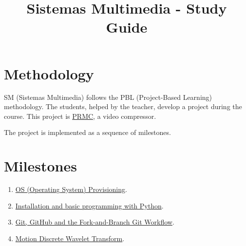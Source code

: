 \title{Sistemas Multimedia - Study Guide}

\maketitle

\section{Methodology}
SM (Sistemas Multimedia) follows the PBL (Project-Based Learning)
methodology. The students, helped by the teacher, develop a project
during the course. This project is
\href{https://github.com/Sistemas-Multimedia/PRMC}{PRMC}, a video
compressor.

The project is implemented as a sequence of milestones.

\section{Milestones}
\begin{enumerate}
\item \href{https://sistemas-multimedia.github.io/study_guide/provisioning/}{OS (Operating System) Provisioning}.
\item \href{https://sistemas-multimedia.github.io/study_guide/python/}{Installation and basic programming with Python}.
\item \href{https://sistemas-multimedia.github.io/study_guide/git/}{Git, GitHub and the Fork-and-Branch Git Workflow}.
\item \href{https://sistemas-multimedia.github.io/study_guide/MDWT/}{Motion Discrete Wavelet Transform}.
\end{enumerate}

